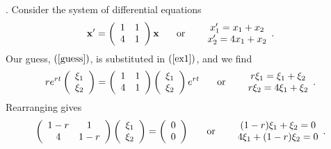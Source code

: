 \documentclass[leqno,DIV=calc,paper=a4,fontsize=11pt]{article}
\theoremstyle{definition}
\theoremstyle{plain}
\theoremstyle{remark}
\newcommand{\R}[1]{$(\ref{#1})$}
\begin{document}
{}. Consider the system of differential
equations
\begin{equation}
{\bf x}' = \left(
\begin{array}{cc}1&1\\4&1\end{array}
\right){\bf x}
\hspace{.25in} \mbox{or} \hspace{.25in}
\begin{array}{cc}x_1'=x_1+x_2\\x_2'=4x_1+x_2\end{array}.
\label{ex1}
\end{equation}
Our guess, \R{guess}, is substituted in \R{ex1}, and we find
\[
re^{rt}\left(\begin{array}{c}\xi_1\\ \xi_2\end{array}\right)
=
\left(
\begin{array}{cc}1&1\\4&1\end{array}
\right)\left(\begin{array}{c}\xi_1\\ \xi_2\end{array}\right)e^{rt}
\hspace{.25in} \mbox{or} \hspace{.25in}
\begin{array}{cc}r\xi_1=\xi_1+\xi_2\\r\xi_2=4\xi_1+\xi_2\end{array}.
\]
Rearranging gives
\begin{equation}
\left(
\begin{array}{cc}1-r&1\\4&1-r\end{array}
\right)\left(\begin{array}{c}\xi_1\\ \xi_2\end{array}\right)=
\left(\begin{array}{c}0\\0\end{array}\right)
\hspace{.25in} \mbox{or} \hspace{.25in}
\begin{array}{cc}(1-r)\xi_1+\xi_2=0\\4\xi_1+(1-r)\xi_2=0\end{array}.
\label{lines}
\end{equation}
\end{document}
